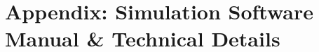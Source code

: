 \chapter{Appendix: Simulation Software Manual \& Technical Details}\label{appendix-simulation-software-manual-technical-details}

